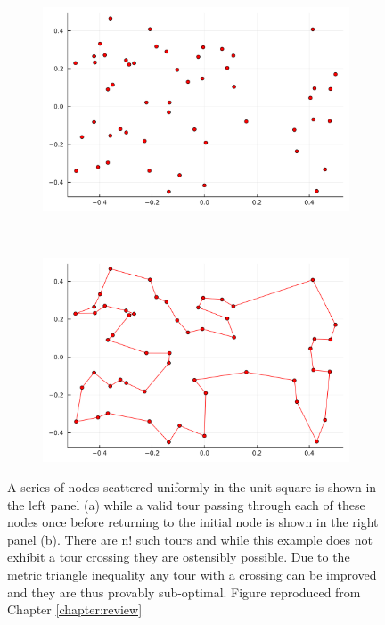 \begin{figure}
	\begin{subfigure}{0.5\linewidth}
		\includegraphics[width = \textwidth]{images/introduction/tourscatter}
		\caption{} 
	\end{subfigure}
	~
	\begin{subfigure}{0.5\linewidth}
		\includegraphics[width = \textwidth]{images/introduction/tourvalid}
		\caption{} 
	\end{subfigure}
	\def\c{A description of the Travelling Salesman Problem. }
	\caption[\c]{A series of nodes scattered uniformly in the unit square is shown in the left panel (a) while a valid tour passing through each of these nodes once before returning to the initial node is shown in the right panel (b). There are n! such tours and while this example does not exhibit a tour crossing they are ostensibly possible. Due to the metric triangle inequality any tour with a crossing can be improved and they are thus provably sub-optimal. Figure reproduced from Chapter \ref{chapter:review} \label{fig:TSPexample}}
\end{figure}
